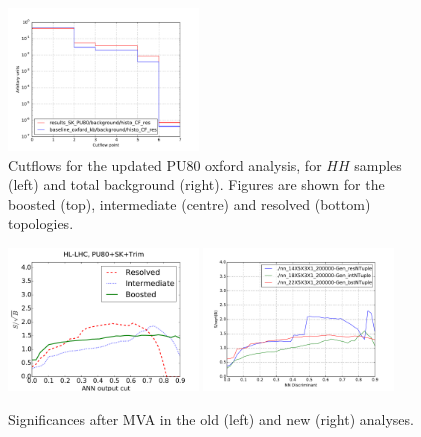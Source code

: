 \documentclass[11pt]{article}
\begin{document}
\begin{figure}[ht]
\begin{center}
\includegraphics[width=0.45\textwidth]{plots/background_PU80_CF_res.pdf}
\caption{Cutflows for the updated PU80 oxford analysis, for $HH$ samples (left) and total background (right). Figures are shown for the boosted (top), intermediate (centre) and resolved (bottom) topologies.}
\label{fig:PU80CF}
\end{center}
\end{figure}

\begin{figure}[ht]
\begin{center}
\includegraphics[width=0.45\textwidth]{plots/ssb_SKPU80.pdf}
\includegraphics[width=0.45\textwidth]{plots/ssb_SKPU80_new.pdf}\\
\caption{Significances after MVA in the old (left) and new (right) analyses.}
\label{fig:PU80sig}
\end{center}
\end{figure}


\end{document}
